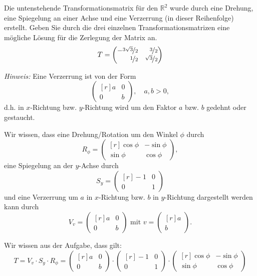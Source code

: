 \documentclass[answers]{exam}
\newcommand{\vektor}[1]{\begin{pmatrix*}[r] #1 \end{pmatrix*}}
\newcommand{\R}{\mathbb{R}}
\begin{document}
\begin{questions}
    \newpage
    \question
    Die untenstehende Transformationsmatrix für den $\R^2$ wurde durch eine Drehung, eine Spiegelung an einer Achse und eine Verzerrung (in dieser Reihenfolge) erstellt.
    Geben Sie durch die drei einzelnen Transformationsmatrizen eine mögliche Lösung für die Zerlegung der Matrix an.
    $$
        T = \vektor{-\nicefrac{3\sqrt{3}}{2} & \nicefrac{3}{2} \\ \nicefrac{1}{2} & \nicefrac{\sqrt{3}}{2} }
    $$

    \emph{Hinweis:} Eine Verzerrung ist von der Form
    $$
        \vektor{a & 0 \\ 0 & b}, \quad a,b>0,
    $$
    d.h. in $x$-Richtung bzw. $y$-Richtung wird um den Faktor $a$ bzw. $b$ gedehnt oder gestaucht.
    \begin{solution}
        Wir wissen, dass eine Drehung/Rotation um den Winkel $\phi$ durch
        $$
            R_\phi = \vektor{\cos\phi & -\sin\phi \\ \sin\phi & \cos\phi},
        $$
        eine Spiegelung an der $y$-Achse durch
        $$
            S_y = \vektor{-1 & 0 \\ 0 & 1}
        $$
        und eine Verzerrung um $a$ in $x$-Richtung bzw. $b$ in $y$-Richtung dargestellt werden kann durch
        $$
            V_v = \vektor{a & 0 \\ 0 & b} \text{ mit } v = \vektor{a \\ b}.
        $$

        Wir wissen aus der Aufgabe, dass gilt:
        $$
            T = V_v \cdot S_y \cdot R_\phi = \vektor{a & 0 \\ 0 & b} \cdot \vektor{-1 & 0 \\ 0 & 1} \cdot \vektor{\cos\phi & -\sin\phi \\ \sin\phi & \cos\phi}
        $$


\end{solution}
\end{questions}
\end{document}
